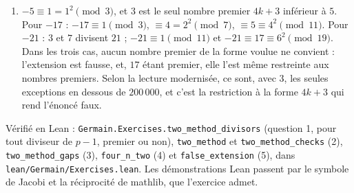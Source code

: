 \documentclass[11pt,a4paper]{article}
\begin{document}
\begin{solution}
\begin{enumerate}
  $q \equiv 3 \pmod 4$, qui ne divise pas $4n+2$ (sinon il diviserait $1$). Alors
  $4n + 2 = (4n + 3) - 1 \equiv -1 \pmod q$, et $\bigl(\frac{-1}{q}\bigr) = -1$ :
  $4n + 2$ est non-résidu de $q$. (Le billet prend $4n + 2 + (2k+1)^2$ ; c'est ici le
  cas $k = 0$.)
\item $-5 \equiv 1 = 1^2 \pmod 3$, et $3$ est le seul nombre premier $4k+3$ inférieur
  à $5$. Pour $-17$ : $-17 \equiv 1 \pmod 3$, $\equiv 4 = 2^2 \pmod 7$,
  $\equiv 5 \equiv 4^2 \pmod{11}$. Pour $-21$ : $3$ et $7$ divisent $21$ ; $-21 \equiv
  1 \pmod{11}$ et $-21 \equiv 17 \equiv 6^2 \pmod{19}$. Dans les trois cas, aucun
  nombre premier de la forme voulue ne convient : l'extension est fausse, et, $17$
  étant premier, elle l'est même restreinte aux nombres premiers. Selon la lecture
  modernisée, ce sont, avec $3$, les seules exceptions en dessous de $200\,000$, et
  c'est la restriction à la forme $4k+3$ qui rend l'énoncé faux.
\end{enumerate}

Vérifié en Lean : \texttt{Germain.Exercises.two\_method\_divisors} (question 1, pour
tout diviseur de $p-1$, premier ou non), \texttt{two\_method} et
\texttt{two\_method\_checks} (2), \texttt{two\_method\_gaps} (3), \texttt{four\_n\_two}
(4) et \texttt{false\_extension} (5), dans \texttt{lean/Germain/Exercises.lean}. Les démonstrations Lean
passent par le symbole de Jacobi et la réciprocité de mathlib, que l'exercice admet.
\end{solution}
\end{document}

